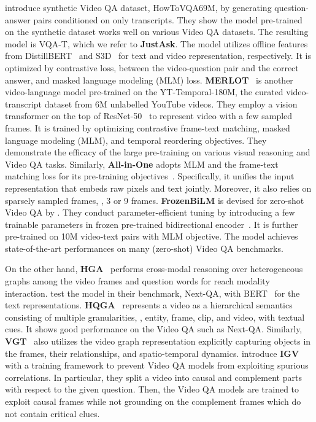 \documentclass{article}
\begin{document}
\citet{yang2021just} introduce synthetic Video QA dataset, HowToVQA69M, by generating question-answer pairs conditioned on only transcripts. They show the model pre-trained on the synthetic dataset works well on various Video QA datasets. The resulting model is VQA-T, which we refer to \textbf{JustAsk}. The model utilizes offline features from DistillBERT~\cite{sanh2019distilbert} and S3D~\cite{xie2018rethinking} for text and video representation, respectively. It is optimized by contrastive loss, between the video-question pair and the correct answer, and masked language modeling (MLM) loss. \textbf{MERLOT}~\cite{zellers2021merlot} is another video-language model pre-trained on the YT-Temporal-180M, the curated video-transcript dataset from 6M unlabelled YouTube videos. They employ a vision transformer on the top of ResNet-50~\cite{he2016deep} to represent video with a few sampled frames. It is trained by optimizing contrastive frame-text matching, masked language modeling (MLM), and temporal reordering objectives. They demonstrate the efficacy of the large pre-training on various visual reasoning and Video QA tasks. Similarly, \textbf{All-in-One} adopts MLM and the frame-text matching loss for its pre-training objectives~\cite{wang2022unifying}. Specifically, it unifies the input representation that embeds raw pixels and text jointly. Moreover, it also relies on sparsely sampled frames, \eg, 3 or 9 frames. \textbf{FrozenBiLM} is devised for zero-shot Video QA by \citet{yang2021just}. They conduct parameter-efficient tuning by introducing a few trainable parameters in frozen pre-trained bidirectional encoder~\cite{he2021deberta}. It is further pre-trained on 10M video-text pairs with MLM objective. The model achieves state-of-the-art performances on many (zero-shot) Video QA benchmarks.

On the other hand, \textbf{HGA}~\cite{jiang2020reasoning} performs cross-modal reasoning over heterogeneous graphs among the video frames and question words for reach modality interaction. \citet{xiao2021next} test the model in their benchmark, Next-QA, with BERT~\cite{devlin2019bert} for the text representations. \textbf{HQGA}~\cite{xiao2022video} represents a video as a hierarchical semantics consisting of multiple granularities, \eg, entity, frame, clip, and video, with textual cues. It shows good performance on the Video QA such as Next-QA. Similarly, \textbf{VGT}~\cite{xiao2022videotransformer} also utilizes the video graph representation explicitly capturing objects in the frames, their relationships, and spatio-temporal dynamics. \citet{li2022invariant} introduce \textbf{IGV} with a training framework to prevent Video QA models from exploiting spurious correlations. In particular, they split a video into causal and complement parts with respect to the given question. Then, the Video QA models are trained to exploit causal frames while not grounding on the complement frames which do not contain critical clues.
\end{document}
